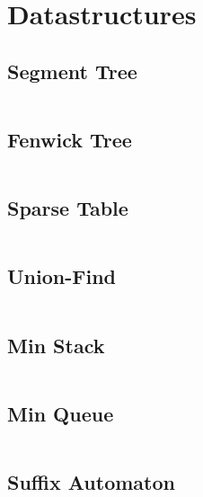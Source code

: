 \documentclass[11pt, a4paper]{amsart}
\begin{document}
	\newpage
	\section{Datastructures}
	\begin{multicols*}{2}		
		\subsection{Segment Tree}
		\inputminted[firstline=3,lastline=31]{c++}{.code/datastructures/segment_tree.cpp}
		\subsection{Fenwick Tree}
		\inputminted[firstline=3,lastline=17]{c++}{.code/datastructures/fenwick_tree.cpp}
		\subsection{Sparse Table}
		\inputminted[firstline=3,lastline=11]{c++}{.code/datastructures/sparse_table.cpp}
		\vfill\null
		\columnbreak
		\subsection{Union-Find}
		\inputminted[firstline=3,lastline=9]{c++}{.code/datastructures/union_find.cpp}
		\subsection{Min Stack}
		\inputminted[firstline=3,lastline=10]{c++}{.code/datastructures/min_stack.cpp}
		\subsection{Min Queue}
		\inputminted[firstline=3,lastline=11]{c++}{.code/datastructures/min_queue.cpp}
		\subsection{Suffix Automaton}
		\inputminted[firstline=3,lastline=30]{c++}{.code/strings/suffixAutomaton.cpp}
		\vfill\null
	\end{multicols*}
\end{document}
